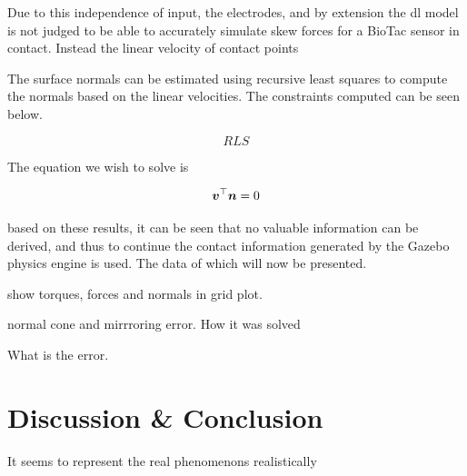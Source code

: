 Due to this independence of input, the electrodes, and by extension the \gls{dl} model is not judged to be able to accurately simulate skew forces for a BioTac sensor in contact. Instead the linear velocity of contact points

The surface normals can be estimated using recursive least squares to compute the normals based on the linear velocities. The constraints computed can be seen below. \medskip

\begin{equation} \label{eq:recursive-least-squares}
	RLS
\end{equation}

The equation we wish to solve is

\begin{equation} \label{eq:velocity-normal-constraint}
	\bm{v}^\top\bm{n}=0
\end{equation}


based on these results, it can be seen that no valuable information can be derived, and thus to continue the contact information generated by the Gazebo physics engine is used. The data of which will now be presented.

show torques, forces and normals in grid plot.

normal cone and mirrroring error. How it was solved

What is the error.

\section{Discussion \& Conclusion}\label{sec:1-tactile-perception-discussion-and-conclusion}

It seems to represent the real phenomenons realistically 




